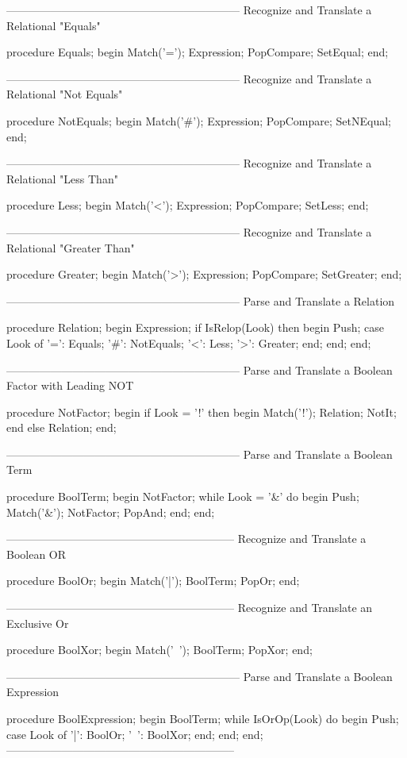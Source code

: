 \documentclass[float=false, crop=false]{standalone}
\begin{document}
\begin{code}
{---------------------------------------------------------------}
{ Recognize and Translate a Relational "Equals" }

procedure Equals;
begin
   Match('=');
   Expression;
   PopCompare;
   SetEqual;
end;


{---------------------------------------------------------------}
{ Recognize and Translate a Relational "Not Equals" }

procedure NotEquals;
begin
   Match('#');
   Expression;
   PopCompare;
   SetNEqual;
end;


{---------------------------------------------------------------}
{ Recognize and Translate a Relational "Less Than" }

procedure Less;
begin
   Match('<');
   Expression;
   PopCompare;
   SetLess;
end;


{---------------------------------------------------------------}
{ Recognize and Translate a Relational "Greater Than" }

procedure Greater;
begin
   Match('>');
   Expression;
   PopCompare;
   SetGreater;
end;


{---------------------------------------------------------------}
{ Parse and Translate a Relation }


procedure Relation;
begin
   Expression;
   if IsRelop(Look) then begin
      Push;
      case Look of
       '=': Equals;
       '#': NotEquals;
       '<': Less;
       '>': Greater;
      end;
   end;
end;


{---------------------------------------------------------------}
{ Parse and Translate a Boolean Factor with Leading NOT }

procedure NotFactor;
begin
   if Look = '!' then begin
      Match('!');
      Relation;
      NotIt;
      end
   else
      Relation;
end;


{---------------------------------------------------------------}
{ Parse and Translate a Boolean Term }

procedure BoolTerm;
begin
   NotFactor;
   while Look = '&' do begin
      Push;
      Match('&');
      NotFactor;
      PopAnd;
   end;
end;


{--------------------------------------------------------------}
{ Recognize and Translate a Boolean OR }

procedure BoolOr;
begin
   Match('|');
   BoolTerm;
   PopOr;
end;


{--------------------------------------------------------------}
{ Recognize and Translate an Exclusive Or }

procedure BoolXor;
begin
   Match('~');
   BoolTerm;
   PopXor;
end;


{---------------------------------------------------------------}
{ Parse and Translate a Boolean Expression }

procedure BoolExpression;
begin
   BoolTerm;
   while IsOrOp(Look) do begin
      Push;
      case Look of
       '|': BoolOr;
       '~': BoolXor;
      end;
   end;
end;
{--------------------------------------------------------------}
\end{code}
\end{document}
